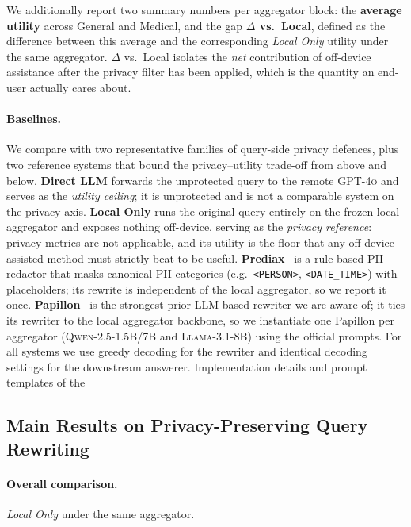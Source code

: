 We additionally report two summary numbers per aggregator block:
the \textbf{average utility} across General and Medical, and the
gap \textbf{$\Delta$ vs.\ Local}, defined as the difference between
this average and the corresponding \textit{Local Only} utility under
the same aggregator. $\Delta$ vs.\ Local isolates the \emph{net}
contribution of off-device assistance after the privacy filter has
been applied, which is the quantity an end-user actually cares about.

\paragraph{Baselines.}
We compare with two representative families of query-side privacy
defences, plus two reference systems that bound the
privacy--utility trade-off from above and below.
\textbf{Direct LLM} forwards the unprotected query to the remote
\textsc{GPT-4o} and serves as the \emph{utility ceiling}; it is
unprotected and is not a comparable system on the privacy axis.
\textbf{Local Only} runs the original query entirely on the frozen
local aggregator and exposes nothing off-device, serving as the
\emph{privacy reference}: privacy metrics are not applicable, and its
utility is the floor that any off-device-assisted method must
strictly beat to be useful. \textbf{Prediax}~\citep{prediax} is a
rule-based PII redactor that masks canonical PII categories
(e.g.\ \texttt{<PERSON>}, \texttt{<DATE\_TIME>}) with placeholders;
its rewrite is independent of the local aggregator, so we report it
once. \textbf{Papillon}~\citep{papillon} is the strongest prior
LLM-based rewriter we are aware of; it ties its rewriter to the local
aggregator backbone, so we instantiate one Papillon per aggregator
(\textsc{Qwen-2.5-1.5B/7B} and \textsc{Llama-3.1-8B}) using the
official prompts. For all systems we use greedy decoding for the
rewriter and identical decoding settings for the downstream
answerer. Implementation details and prompt templates of the

\subsection{Main Results on Privacy-Preserving Query Rewriting}
\label{sec:exp-main}

\paragraph{Overall comparison.}\textit{Local Only} under the same aggregator.

